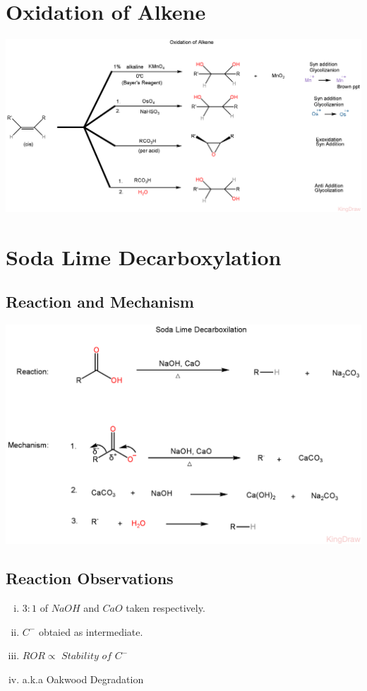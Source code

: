 \documentclass{article}
\begin{document}
\section{Oxidation of Alkene}

\includegraphics[scale=0.18]{oxidationofalkene_1723137821943.PNG}

\section{Soda Lime Decarboxylation}
\subsection{Reaction and Mechanism}
\includegraphics[scale=0.25]{Sodalime_1723140982114.PNG}
\subsection{Reaction Observations}
\begin{enumerate}[i.]
    \item $3:1$ of $NaOH$ and $CaO$ taken respectively.
    \item $C^-$ obtaied as intermediate.
    \item $ROR \propto \textit{ Stability of } C^-$
    \item a.k.a Oakwood Degradation
\end{enumerate}
\end{document}
